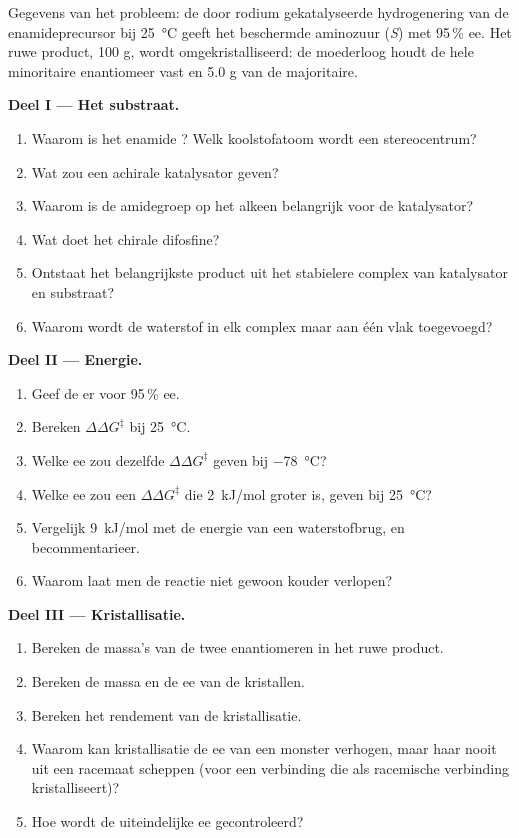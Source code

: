 \begin{problem}
\label{pb:b3:asymmetric-synthesis:1}
Gegevens van het probleem: de door rodium gekatalyseerde hydrogenering
van de enamideprecursor bij \qty{25}{\celsius} geeft het beschermde aminozuur (\textit{S}) met 95\,\% ee. Het ruwe
product, 100 g, wordt omgekristalliseerd: de moederloog houdt de hele
minoritaire enantiomeer vast en 5.0 g van de majoritaire.

\medskip\noindent\textbf{Deel I --- Het substraat.}
\begin{enumerate}
  \item Waarom is het enamide ? Welk koolstofatoom wordt een
        stereocentrum?
  \item Wat zou een achirale katalysator geven?
  \item Waarom is de amidegroep op het alkeen belangrijk voor de
        katalysator?
  \item Wat doet het chirale difosfine?
  \item Ontstaat het belangrijkste product uit het stabielere complex van
        katalysator en substraat?
  \item Waarom wordt de waterstof in elk complex maar aan één vlak
        toegevoegd?
\end{enumerate}

\medskip\noindent\textbf{Deel II --- Energie.}
\begin{enumerate}[resume]
  \item Geef de er voor 95\,\% ee.
  \item Bereken $\Delta\Delta G^\ddagger$ bij \qty{25}{\celsius}.
  \item Welke ee zou dezelfde $\Delta\Delta G^\ddagger$ geven bij \qty{-78}{\celsius}?
  \item Welke ee zou een $\Delta\Delta G^\ddagger$ die \qty{2}{kJ/mol} groter is, geven bij \qty{25}{\celsius}?
  \item Vergelijk \qty{9}{kJ/mol} met de energie van een waterstofbrug, en
        becommentarieer.
  \item Waarom laat men de reactie niet gewoon kouder verlopen?
\end{enumerate}

\medskip\noindent\textbf{Deel III --- Kristallisatie.}
\begin{enumerate}[resume]
  \item Bereken de massa's van de twee enantiomeren in het ruwe product.
  \item Bereken de massa en de ee van de kristallen.
  \item Bereken het rendement van de kristallisatie.
  \item Waarom kan kristallisatie de ee van een monster verhogen, maar
        haar nooit uit een racemaat scheppen (voor een verbinding die als
        racemische verbinding kristalliseert)?
  \item Hoe wordt de uiteindelijke ee gecontroleerd?
\end{enumerate}


\end{problem}
